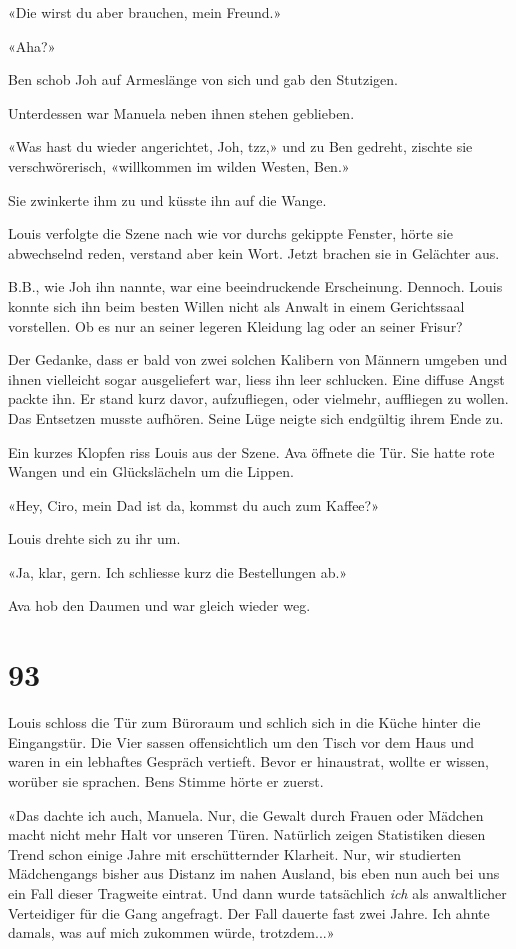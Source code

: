 «Die wirst du aber brauchen, mein Freund.»

«Aha?»

Ben schob Joh auf Armeslänge von sich und gab den Stutzigen.

Unterdessen war Manuela neben ihnen stehen geblieben.

«Was hast du wieder angerichtet, Joh, tzz,» und zu Ben gedreht, zischte
sie verschwörerisch, «willkommen im wilden Westen, Ben.»

Sie zwinkerte ihm zu und küsste ihn auf die Wange.

Louis verfolgte die Szene nach wie vor durchs gekippte Fenster, hörte
sie abwechselnd reden, verstand aber kein Wort. Jetzt brachen sie in
Gelächter aus.

B.B., wie Joh ihn nannte, war eine beeindruckende Erscheinung. Dennoch.
Louis konnte sich ihn beim besten Willen nicht als Anwalt in einem
Gerichtssaal vorstellen. Ob es nur an seiner legeren Kleidung lag oder
an seiner Frisur?

Der Gedanke, dass er bald von zwei solchen Kalibern von Männern umgeben
und ihnen vielleicht sogar ausgeliefert war, liess ihn leer schlucken.
Eine diffuse Angst packte ihn. Er stand kurz davor, aufzufliegen, oder
vielmehr, auffliegen zu wollen. Das Entsetzen musste aufhören. Seine
Lüge neigte sich endgültig ihrem Ende zu.

Ein kurzes Klopfen riss Louis aus der Szene. Ava öffnete die Tür. Sie
hatte rote Wangen und ein Glückslächeln um die Lippen.

«Hey, Ciro, mein Dad ist da, kommst du auch zum Kaffee?»

Louis drehte sich zu ihr um.

«Ja, klar, gern. Ich schliesse kurz die Bestellungen ab.»

Ava hob den Daumen und war gleich wieder weg.

\chapter{93}\label{section-93}

Louis schloss die Tür zum Büroraum und schlich sich in die Küche hinter
die Eingangstür. Die Vier sassen offensichtlich um den Tisch vor dem
Haus und waren in ein lebhaftes Gespräch vertieft. Bevor er hinaustrat,
wollte er wissen, worüber sie sprachen. Bens Stimme hörte er zuerst.

«Das dachte ich auch, Manuela. Nur, die Gewalt durch Frauen oder Mädchen
macht nicht mehr Halt vor unseren Türen. Natürlich zeigen Statistiken
diesen Trend schon einige Jahre mit erschütternder Klarheit. Nur, wir
studierten Mädchengangs bisher aus Distanz im nahen Ausland, bis eben
nun auch bei uns ein Fall dieser Tragweite eintrat. Und dann wurde
tatsächlich \emph{ich} als anwaltlicher Verteidiger für die Gang
angefragt. Der Fall dauerte fast zwei Jahre. Ich ahnte damals, was auf
mich zukommen würde, trotzdem...»

